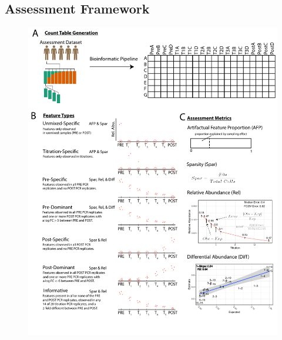 \documentclass[linenumbers]{bmcart}
\begin{document}
\subsection*{Assessment Framework}
\begin{figure}
\centering
\includegraphics{AssessmentFramework.pdf}

\end{figure}
\end{document}

